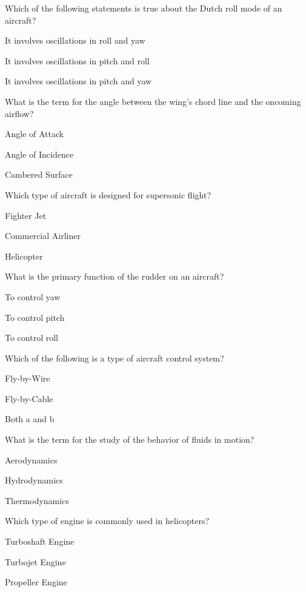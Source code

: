 \begin{enhancedmcq}{Which of the following statements is true about the Dutch roll mode of an aircraft?}
\item It involves oscillations in roll and yaw
\item It involves oscillations in pitch and roll
\item It involves oscillations in pitch and yaw

\end{enhancedmcq}
\begin{enhancedmcq}{What is the term for the angle between the wing's chord line and the oncoming airflow?}
\item Angle of Attack
\item Angle of Incidence
\item Cambered Surface

\end{enhancedmcq}
\begin{enhancedmcq}{Which type of aircraft is designed for supersonic flight?}
\item Fighter Jet
\item Commercial Airliner
\item Helicopter

\end{enhancedmcq}
\begin{enhancedmcq}{What is the primary function of the rudder on an aircraft?}
\item To control yaw
\item To control pitch
\item To control roll

\end{enhancedmcq}
\begin{enhancedmcq}{Which of the following is a type of aircraft control system?}
\item Fly-by-Wire
\item Fly-by-Cable
\item Both a and b

\end{enhancedmcq}
\begin{enhancedmcq}{What is the term for the study of the behavior of fluids in motion?}
\item Aerodynamics
\item Hydrodynamics
\item Thermodynamics

\end{enhancedmcq}
\begin{enhancedmcq}{Which type of engine is commonly used in helicopters?}
\item Turboshaft Engine
\item Turbojet Engine
\item Propeller Engine

\end{enhancedmcq}
